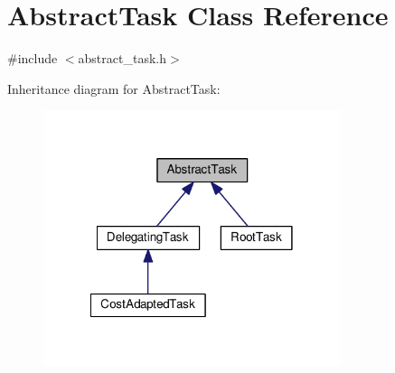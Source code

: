 \hypertarget{classAbstractTask}{\section{Abstract\-Task Class Reference}
\label{classAbstractTask}
}


{\ttfamily \#include $<$abstract\-\_\-task.\-h$>$}



Inheritance diagram for Abstract\-Task\-:
\nopagebreak
\begin{figure}[H]
\begin{center}
\leavevmode
\includegraphics[width=246pt]{classAbstractTask__inherit__graph}
\end{center}
\end{figure}

